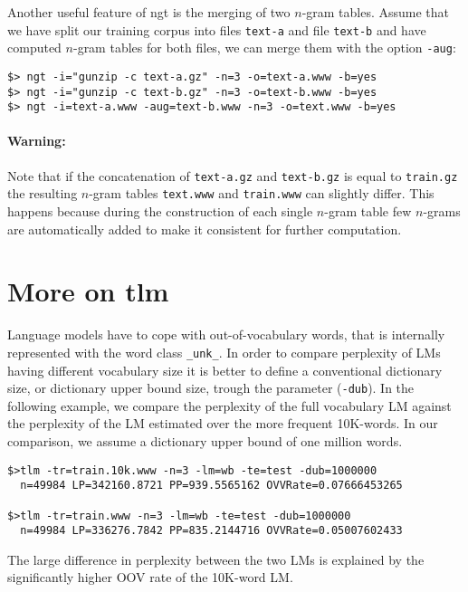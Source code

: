 \documentclass[11pt]{article}
\begin{document}
\noindent
Another useful feature of ngt is the merging of two $n$-gram tables. Assume that we have 
split our training corpus into files  {\tt text-a} and file {\tt text-b} and have computed $n$-gram 
tables for both files, we can merge them with the option {\tt -aug}:
\begin{verbatim}
$> ngt -i="gunzip -c text-a.gz" -n=3 -o=text-a.www -b=yes
$> ngt -i="gunzip -c text-b.gz" -n=3 -o=text-b.www -b=yes
$> ngt -i=text-a.www -aug=text-b.www -n=3 -o=text.www -b=yes
\end{verbatim}

\paragraph{Warning:} Note that if the concatenation of {\tt text-a.gz} and {\tt text-b.gz} is equal to {\tt train.gz} the resulting $n$-gram tables
{\tt text.www} and {\tt train.www} can slightly differ. This happens because during the construction of each single $n$-gram table few $n$-grams are automatically added to make it consistent for further computation.


\newpage
\section{More on tlm}
Language models have to  cope with out-of-vocabulary words, that is internally represented
with the word class  {\tt \_unk\_}.  In order  to
compare perplexity of LMs having  different vocabulary size it is better
to define  a conventional dictionary  size, or dictionary  upper bound
size,  trough the  parameter  ({\tt -dub}).  In  the  following example,  we
compare the perplexity of the full vocabulary LM against the perplexity of the
LM estimated over the more frequent 10K-words. In our comparison, we assume a dictionary 
upper bound of one million words.

\begin{verbatim}
$>tlm -tr=train.10k.www -n=3 -lm=wb -te=test -dub=1000000
  n=49984 LP=342160.8721 PP=939.5565162 OVVRate=0.07666453265

$>tlm -tr=train.www -n=3 -lm=wb -te=test -dub=1000000
  n=49984 LP=336276.7842 PP=835.2144716 OVVRate=0.05007602433
\end{verbatim}


\noindent
The  large  difference  in  perplexity  between the two LMs is   explained  by  the 
significantly higher  OOV rate of the 10K-word LM.
\end{document}
